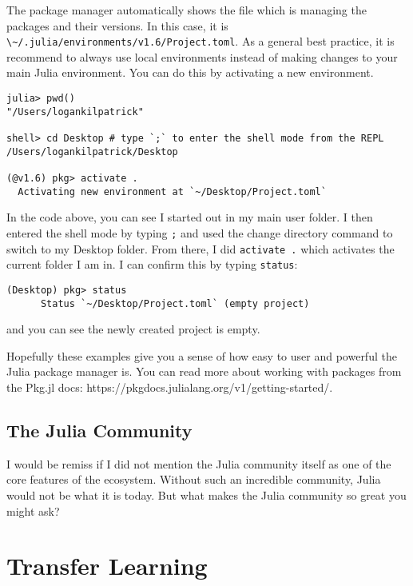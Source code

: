 \documentclass[
  notoc %
]{tufte-book}
\newcommand{\passthrough}[1]{#1}
\begin{document}
The package manager automatically shows the file which is managing the
packages and their versions. In this case, it is
\passthrough{\lstinline!\~/.julia/environments/v1.6/Project.toml!}. As a
general best practice, it is recommend to always use local environments
instead of making changes to your main Julia environment. You can do
this by activating a new environment.

\begin{lstlisting}
julia> pwd()
"/Users/logankilpatrick"

shell> cd Desktop # type `;` to enter the shell mode from the REPL
/Users/logankilpatrick/Desktop

(@v1.6) pkg> activate .
  Activating new environment at `~/Desktop/Project.toml`
\end{lstlisting}

In the code above, you can see I started out in my main user folder. I
then entered the shell mode by typing \passthrough{\lstinline!;!} and
used the change directory command to switch to my Desktop folder. From
there, I did \passthrough{\lstinline!activate .!} which activates the
current folder I am in. I can confirm this by typing
\passthrough{\lstinline!status!}:

\begin{lstlisting}
(Desktop) pkg> status
      Status `~/Desktop/Project.toml` (empty project)
\end{lstlisting}

and you can see the newly created project is empty.

Hopefully these examples give you a sense of how easy to user and
powerful the Julia package manager is. You can read more about working
with packages from the Pkg.jl docs:
https://pkgdocs.julialang.org/v1/getting-started/.

\hypertarget{sec:community}{%
\section{The Julia Community}\label{sec:community}}

I would be remiss if I did not mention the Julia community itself as one
of the core features of the ecosystem. Without such an incredible
community, Julia would not be what it is today. But what makes the Julia
community so great you might ask?

\hypertarget{sec:transfer_learning}{%
\chapter{Transfer Learning}\label{sec:transfer_learning}}
\end{document}
